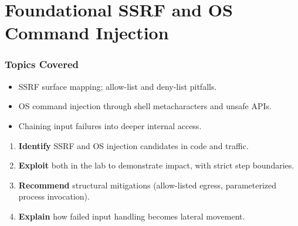 \documentclass[11pt,letterpaper,oneside]{report}
\begin{document}
\chapter{Foundational SSRF and OS Command Injection}

\subsection*{Topics Covered}
\begin{itemize}
  \item SSRF surface mapping; allow-list and deny-list pitfalls.
  \item OS command injection through shell metacharacters and unsafe APIs.
  \item Chaining input failures into deeper internal access.
\end{itemize}

\begin{outcomes}
\begin{enumerate}
  \item \textbf{Identify} SSRF and OS injection candidates in code and traffic.
  \item \textbf{Exploit} both in the lab to demonstrate impact, with strict step boundaries.
  \item \textbf{Recommend} structural mitigations (allow-listed egress, parameterized process invocation).
  \item \textbf{Explain} how failed input handling becomes lateral movement.
\end{enumerate}
\end{outcomes}
\end{document}
